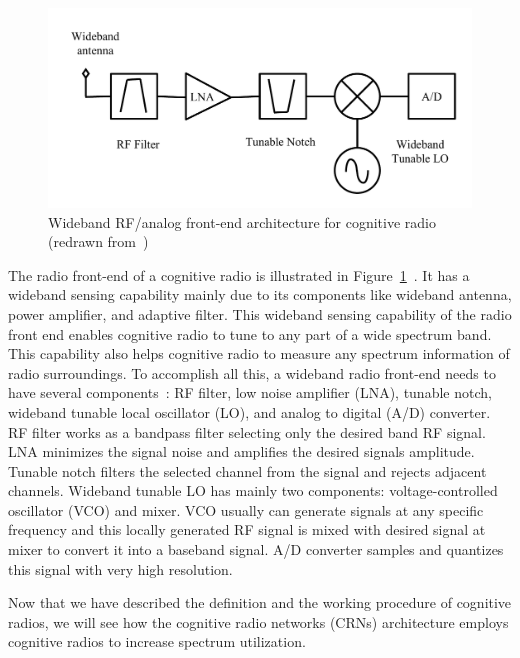 \begin{figure}[!htbp]
\begin{center}
    \includegraphics[scale=0.5]{myFigures/RFFrontEnd}
    \caption{Wideband RF/analog front-end architecture for cognitive radio (redrawn from~\cite{cabric2004implementation})}
    \label{fig:RFFrontEnd}
\end{center}
\end{figure}

The radio front-end of a cognitive radio is illustrated in Figure~\ref{fig:RFFrontEnd}~\cite{cabric2004implementation}. It has a wideband sensing capability mainly due to its components like wideband antenna, power amplifier, and adaptive filter. This wideband sensing capability of the radio front end enables cognitive radio to tune to any part of a wide spectrum band. This capability also helps cognitive radio to measure any spectrum information of radio surroundings. To accomplish all this, a wideband radio front-end needs to have several components~\cite{akyildiz2006next}: RF filter, low noise amplifier (LNA), tunable notch, wideband tunable local oscillator (LO), and analog to digital (A/D) converter. RF filter works as a bandpass filter selecting only the desired band RF signal. LNA minimizes the signal noise and amplifies the desired signals amplitude. Tunable notch filters the selected channel from the signal and rejects adjacent channels. Wideband tunable LO has mainly two components: voltage-controlled oscillator (VCO) and mixer. VCO usually can generate signals at any specific frequency and this locally generated RF signal is mixed with desired signal at mixer to convert it into a baseband signal. A/D converter samples and quantizes this signal with very high resolution.

Now that we have described the definition and the working procedure of cognitive radios, we will see how the cognitive radio networks (CRNs) architecture employs cognitive radios to increase spectrum utilization. 


